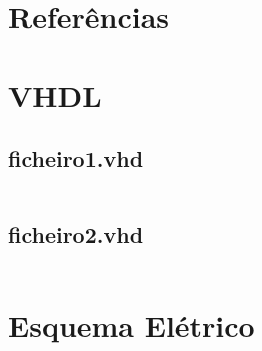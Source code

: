 \documentclass[12pt]{article}
\begin{document}
\section*{Referências}


\appendix
\clearpage
\section{VHDL}
\subsection{ficheiro1.vhd}
\begin{minipage}{\linewidth}
\footnotesize
\inputminted{vhdl}{ficheiro1.vhd}
\end{minipage}

\subsection{ficheiro2.vhd}
\begin{minipage}{\linewidth}
\footnotesize
\inputminted{vhdl}{ficheiro2.vhd}
\end{minipage}

\clearpage
\section{Esquema Elétrico}
\end{document}
